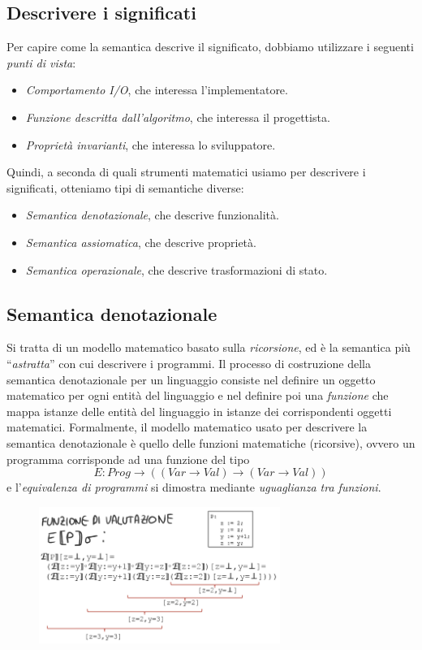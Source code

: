 \documentclass[a4paper,oneside,titlepage]{book}
\begin{document}
\subsection{Descrivere i significati}
Per capire come la semantica descrive il significato, dobbiamo utilizzare i seguenti \textit{punti di vista}:
\begin{itemize}
	\item \textit{Comportamento I/O}, che interessa l'implementatore.
	\item \textit{Funzione descritta dall'algoritmo}, che interessa il progettista.
	\item \textit{Proprietà invarianti}, che interessa lo sviluppatore.
\end{itemize}
Quindi, a seconda di quali strumenti matematici usiamo per descrivere i significati, otteniamo tipi di semantiche diverse:
\begin{itemize}
	\item \textit{Semantica denotazionale}, che descrive funzionalità.
	\item \textit{Semantica assiomatica}, che descrive proprietà.
	\item \textit{Semantica operazionale}, che descrive trasformazioni di stato.
\end{itemize}

\subsection{Semantica denotazionale}
Si tratta di un modello matematico basato sulla \textit{ricorsione}, ed è la semantica più ``\textit{astratta}'' con cui descrivere i programmi. Il processo di costruzione della semantica denotazionale per un linguaggio consiste nel definire un oggetto matematico per ogni entità del linguaggio e nel definire poi una \textit{funzione} che mappa istanze delle entità del linguaggio in istanze dei corrispondenti oggetti matematici. Formalmente, il modello matematico usato per descrivere la semantica denotazionale è quello delle funzioni matematiche (ricorsive), ovvero un programma corrisponde ad una funzione del tipo
\[ E: Prog \rightarrow ((Var \rightarrow Val) \rightarrow (Var \rightarrow Val)) \]
e l'\textit{equivalenza di programmi} si dimostra mediante \textit{uguaglianza tra funzioni}.
\begin{figure}[htp]
	\centering
	\includegraphics[width=0.7\textwidth, height=0.7\textheight, keepaspectratio]{denotazionale.png}
\end{figure}
\end{document}

